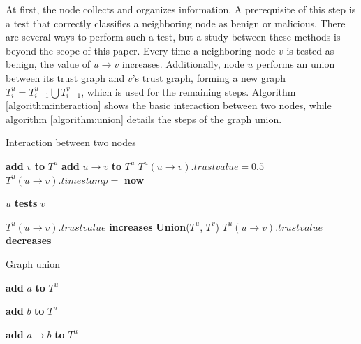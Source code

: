 At first, the node collects and organizes information.
A prerequisite of this step is a test that correctly classifies a neighboring node as benign or malicious.
There are several ways to perform such a test, but a study between these methods is beyond the scope of this paper.
Every time a neighboring node $v$ is tested as benign, the value of $u \rightarrow v$ increases.
Additionally, node $u$ performs an union between its trust graph and $v$'s trust graph, forming a new graph $T^u_i = T^u_{i-1} \bigcup T^v_{i-1}$, which is used for the remaining steps.
Algorithm  \autoref{algorithm:interaction} shows the basic interaction between two nodes, while algorithm \autoref{algorithm:union} details the steps of the graph union.

\begin{algorithm}
\caption{Interaction between two nodes}\label{algorithm:interaction}
\begin{algorithmic}[1]


	\State \textbf{add} $v$ \textbf{to} $T^u$
	\State \textbf{add} $u\rightarrow v$ \textbf{to} $T^u$
	\State $T^u(u\rightarrow v).trustvalue = 0.5$
	\State $T^u(u\rightarrow v).timestamp = $ \textbf{now}
\EndIf

\State $u$ \textbf{tests} $v$

	\State $T^u(u\rightarrow v).trustvalue$ \textbf{increases}
	\State \textbf{Union}($T^u$, $T^v$)
\Else
	\State $T^u(u\rightarrow v).trustvalue$ \textbf{decreases}
\EndIf


\EndFunction
\end{algorithmic}
\end{algorithm}

\begin{algorithm}
\caption{Graph union}\label{algorithm:union}
\begin{algorithmic}[1]



		\State \textbf{add} $a$ \textbf{to} $T^u$
	\EndIf
	
		\State \textbf{add} $b$ \textbf{to} $T^u$
	\EndIf
	
		\State \textbf{add} $a\rightarrow b$ \textbf{to} $T^u$
	\EndIf
\EndFor

\EndFunction
\end{algorithmic}
\end{algorithm}

